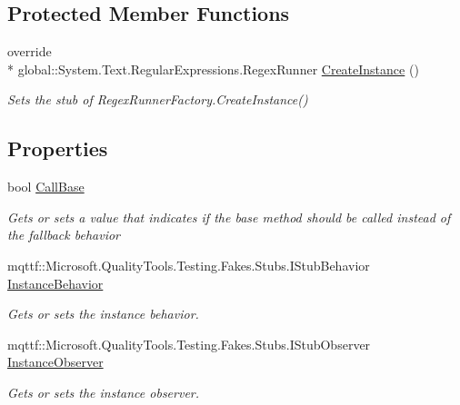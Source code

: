 \subsection*{Protected Member Functions}
\begin{DoxyCompactItemize}
\item 
override \\*
global\-::\-System.\-Text.\-Regular\-Expressions.\-Regex\-Runner \hyperlink{class_system_1_1_text_1_1_regular_expressions_1_1_fakes_1_1_stub_regex_runner_factory_a3bc108f85c9f34a28230f657f5c21f95}{Create\-Instance} ()
\begin{DoxyCompactList}\small\item\em Sets the stub of Regex\-Runner\-Factory.\-Create\-Instance()\end{DoxyCompactList}\end{DoxyCompactItemize}
\subsection*{Properties}
\begin{DoxyCompactItemize}
\item 
bool \hyperlink{class_system_1_1_text_1_1_regular_expressions_1_1_fakes_1_1_stub_regex_runner_factory_a84834e2b095d8d65d80a3720331bb1a9}{Call\-Base}
\begin{DoxyCompactList}\small\item\em Gets or sets a value that indicates if the base method should be called instead of the fallback behavior\end{DoxyCompactList}\item 
mqttf\-::\-Microsoft.\-Quality\-Tools.\-Testing.\-Fakes.\-Stubs.\-I\-Stub\-Behavior \hyperlink{class_system_1_1_text_1_1_regular_expressions_1_1_fakes_1_1_stub_regex_runner_factory_a22cfd533332e4278733485b4012261ff}{Instance\-Behavior}
\begin{DoxyCompactList}\small\item\em Gets or sets the instance behavior.\end{DoxyCompactList}\item 
mqttf\-::\-Microsoft.\-Quality\-Tools.\-Testing.\-Fakes.\-Stubs.\-I\-Stub\-Observer \hyperlink{class_system_1_1_text_1_1_regular_expressions_1_1_fakes_1_1_stub_regex_runner_factory_aa2a4e9f49b07cf0f9312f82ee272a59c}{Instance\-Observer}
\begin{DoxyCompactList}\small\item\em Gets or sets the instance observer.\end{DoxyCompactList}\end{DoxyCompactItemize}


